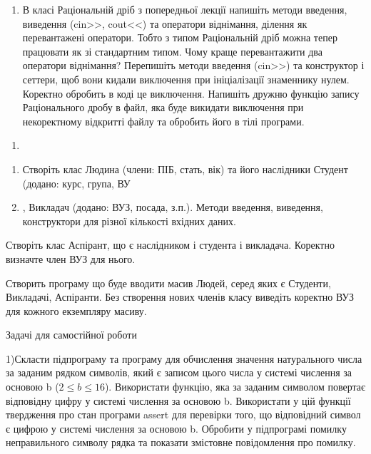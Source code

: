\documentclass[]{article}
\makeatletter
\newcommand{\xslalph}[1]{\expandafter\@xslalph\csname c@#1\endcsname}
\newcommand{\@xslalph}[1]{%
    \ifcase#1\or а\or б\or в\or г\or д\or e\or є\or ж\or з\or i%
    \or й\or к\or л\or м\or н\or о\or п\or р\or с\or т%
    \or у\or ф\or х\or ц\or ч\or ш\or ю\or я\or аа\or бб\or вв%
    \else\@ctrerr\fi%
}
\makeatother
\begin{document}
\begin{enumerate}
\begin{enumerate}[label=\xslalph*)]
\begin{enumerate}
\begin{enumerate}[label=\xslalph*)]
\begin{enumerate}
\begin{enumerate}[label=\xslalph*)]
\begin{enumerate}
\begin{enumerate}[label=\xslalph*)]
\begin{enumerate}
\def\labelenumi{\arabic{enumi})}
\item
  В класі Раціональній дріб з попередньої лекції напишіть методи
  введення, виведення (cin\textgreater{}\textgreater{},
  cout\textless{}\textless{}) та оператори віднімання, ділення як
  перевантажені оператори. Тобто з типом Раціональній дріб можна тепер
  працювати як зі стандартним типом. Чому краще перевантажити два
  оператори віднімання? Перепишіть методи введення
  (cin\textgreater{}\textgreater{}) та конструктор і сеттери, щоб вони
  кидали виключення при ініціалізації знаменнику нулем. Коректно
  обробить в коді це виключення. Напишіть дружню функцію запису
  Раціонального дробу в файл, яка буде викидати виключення при
  некоректному відкритті файлу та обробить його в тілі програми.
\end{enumerate}

\begin{enumerate}
\def\labelenumi{\arabic{enumi})}
\item
\end{enumerate}

\begin{enumerate}
\def\labelenumi{\arabic{enumi})}
\item
  Створіть клас Людина (члени: ПІБ, стать, вік) та його наслідники
  Студент (додано: курс, група, ВУ\item, Викладач (додано: ВУЗ, посада,
  з.п.). Методи введення, виведення, конструктори для різної кількості
  вхідних даних.
\end{enumerate}

Створіть клас Аспірант, що є наслідником і студента і викладача.
Коректно визначте член ВУЗ для нього.

Створить програму що буде вводити масив Людей, серед яких є Студенти,
Викладачі, Аспіранти. Без створення нових членів класу виведіть коректно
ВУЗ для кожного екземпляру масиву.

Задачі для самостійної роботи

1)Скласти підпрограму та програму для обчислення значення натурального
числа за заданим рядком символів, який є записом цього числа у системі
числення за основою b (\(2 \leq b \leq 16\)). Використати функцію, яка
за заданим символом повертає відповідну цифру у системі числення за
основою b. Використати у цій функції твердження про стан програми assert
для перевірки того, що відповідний символ є цифрою у системі числення за
основою b. Обробити у підпрограмі помилку неправильного символу рядка та
показати змістовне повідомлення про помилку.


\end{enumerate}
\end{enumerate}
\end{enumerate}
\end{enumerate}
\end{enumerate}
\end{enumerate}
\end{enumerate}
\end{enumerate}
\end{document}

